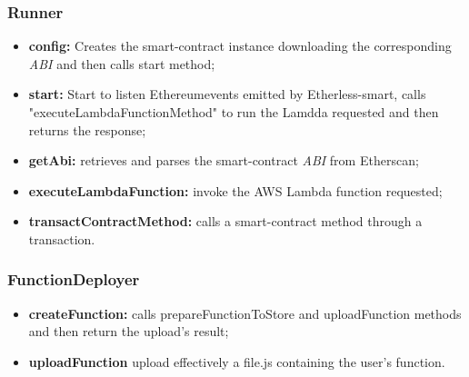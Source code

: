 \subsubsection{Runner}
\begin{itemize}
	\item \textbf{config:} Creates the smart-contract instance downloading the corresponding \textit{ABI\glo} and then calls start method;
	\item \textbf{start:} Start to listen Ethereum\glo events emitted by Etherless-smart, calls "executeLambdaFunctionMethod" to run the Lamdda requested and then returns the response;
	\item \textbf{getAbi:} retrieves and parses the smart-contract \textit{ABI\glo} from Etherscan;
	\item \textbf{executeLambdaFunction:} invoke the AWS Lambda function requested;
	\item \textbf{transactContractMethod:} calls a smart-contract method through a transaction.
\end{itemize}
\subsubsection{FunctionDeployer}
\begin{itemize}
	\item \textbf{createFunction:} calls prepareFunctionToStore and uploadFunction methods and then return the upload's result;
	\item \textbf{uploadFunction} upload effectively a file.js containing the user's function.
	
\end{itemize}
